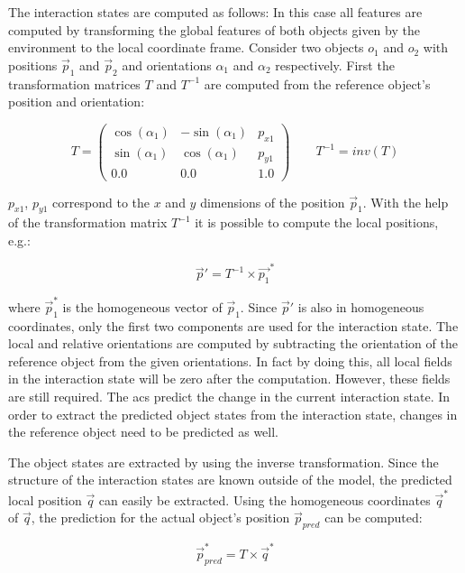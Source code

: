 The interaction states are computed as follows:
In this case all features are computed by transforming the global features of both objects given by the environment to the local coordinate frame. Consider two objects $o_1$ and $o_2$ with positions $\vec{p}_1$ and $\vec{p}_2$ and orientations $\alpha_1$ and $\alpha_2$ respectively. First the transformation matrices $T$ and $T^{-1}$ are computed from the reference object's position and orientation:

\begin{equation}
T = \begin{pmatrix}
\cos(\alpha_1) & -\sin(\alpha_1) & p_{x1} \\
\sin(\alpha_1) & \cos(\alpha_1) & p_{y1} \\
0.0 & 0.0 & 1.0
\end{pmatrix}
\qquad
T^{-1} = inv(T)
\label{eq:transMatrix}
\end{equation}

$p_{x1}$, $p_{y1}$ correspond to the $x$ and $y$ dimensions of the position $\vec{p}_1$. With the help of the transformation matrix $T^{-1}$ it is possible to compute the local positions, e.g.:

\begin{equation}
\vec{p}' = T^{-1} \times \vec{p_1}^*
\end{equation}

where $\vec{p}_1^*$ is the homogeneous vector of $\vec{p}_1$. Since $\vec{p}'$ is also in homogeneous coordinates, only the first two components are used for the interaction state. The local and relative orientations are computed by subtracting the orientation of the reference object from the given orientations. In fact by doing this, all local fields in the interaction state will be zero after the computation. However, these fields are still required. The \glspl{ac} predict the change in the current interaction state. In order to extract the predicted object states from the interaction state, changes in the reference object need to be predicted as well. 

The object states are extracted by using the inverse transformation. Since the structure of the interaction states are known outside of the model, the predicted local position $\vec{q}$ can easily be extracted. Using the homogeneous coordinates $\vec{q}^*$ of $\vec{q}$, the prediction for the actual object's position $\vec{p}_{pred}$ can be computed:

\begin{equation}
\vec{p}_{pred}^* = T \times \vec{q}^*
\end{equation}


